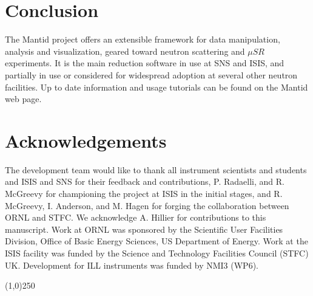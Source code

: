 \documentclass[1p]{elsarticle}
\begin{document}
\section{Conclusion}
The Mantid project offers an extensible framework for data manipulation, analysis and visualization, geared toward neutron scattering and $\mu SR$ experiments. It is the main reduction software in use at SNS and ISIS, and partially in use or considered for widespread adoption at several other neutron facilities. Up to date information and usage tutorials can be found on the Mantid web page\cite{webpage}. 

\section{Acknowledgements}
The development team would like to thank all instrument scientists and students and ISIS and SNS for their feedback and contributions, P. Radaelli, and R. McGreevy for championing the project at ISIS in the initial stages, and R. McGreevy, I. Anderson, and M. Hagen for forging the collaboration between ORNL and STFC. We acknowledge A. Hillier for contributions to this manuscript. Work at ORNL was sponsored by the Scientific User Facilities Division, Office of Basic Energy Sciences, US Department of Energy. Work at the ISIS facility was funded by the Science and Technology Facilities Council (STFC) UK. Development for ILL instruments was funded by NMI3 (WP6).

\begin{center}
\line(1,0){250}
\end{center}


{}

\end{document}
